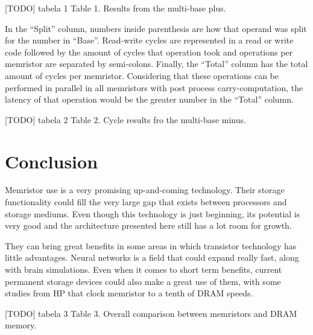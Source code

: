 \documentclass[ecp,tc,english]{iiufrgs}
\begin{document}
[TODO] tabela 1
Table 1. Results from the multi-base plus.

In the “Split” column, numbers inside parenthesis are how that operand was split for the number in “Base”. Read-write cycles are represented in a read or write code followed by the amount of cycles that operation took and operations per memristor are separated by semi-colons. Finally, the “Total” column has the total amount of cycles per memristor. Considering that these operations can be performed in parallel in all memristors with post process carry-computation, the latency of that operation would be the greater number in the “Total” column.

[TODO] tabela 2
Table 2. Cycle results fro the multi-base minus.

\chapter{Conclusion}

Memristor use is a very promising up-and-coming technology. Their storage functionality could fill the very large gap that exists between processors and storage mediums. Even though this technology is just beginning, its potential is very good and the architecture presented here still has a lot room for growth.

They can bring great benefits in some areas in which transistor technology has little advantages. Neural networks is a field that could expand really fast, along with brain simulations. Even when it comes to short term benefits, current permanent storage devices could also make a great use of them, with some studies from HP that clock memristor to a tenth of DRAM speeds.

[TODO] tabela 3
Table 3. Overall comparison between memristors and DRAM memory.



\end{document}
